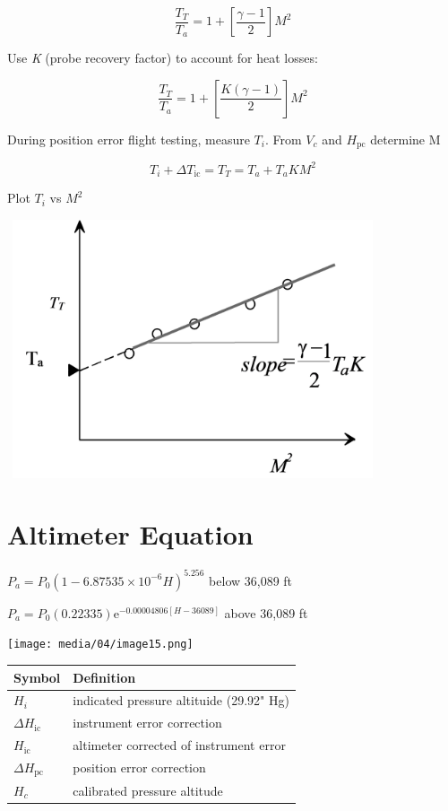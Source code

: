 \documentclass[
]{book}
\begin{document}
\[ \frac{T_T}{T_a} = 1 + \left[ \frac{\gamma - 1}{2} \right] M^2 \]

Use \emph{K} (probe recovery factor) to account for heat losses:

\[ \frac{T_T}{T_a} = 1 + \left[ \frac{K(\gamma - 1)}{2} \right] M^2 \]

During position error flight testing, measure \(T_i\). From \(V_c\) and \(H_{\mathrm{pc}}\) determine M

\[ T_i + \Delta T_{\mathrm{ic}} = T_T = T_a + T_aKM^2 \]

Plot \(T_i\) vs \(M^2\)

\includegraphics[width=4.3125in,height=3in]{media/04/image14.svg}

\hypertarget{altimeter-equation}{%
\section{Altimeter Equation}\label{altimeter-equation}}

\(P_a = P_0 \left(1-6.875 35 \times 10^{-6} H\right)^{5.256}\) below 36,089 ft

\(P_a = P_0 \left(0.223 35 \right) \textrm{e}^{-0.000 048 06[H-36089]}\) above 36,089 ft

\texttt{[image: media/04/image15.png]}

\begin{longtable}[]{@{}ll@{}}
\toprule
Symbol & Definition\tabularnewline
\midrule
\endhead
\(H_i\) & indicated pressure altituide (29.92" Hg)\tabularnewline
\(\Delta H_{\mathrm{ic}}\) & instrument error correction\tabularnewline
\(H_{\mathrm{ic}}\) & altimeter corrected of instrument error\tabularnewline
\(\Delta H_{\mathrm{pc}}\) & position error correction\tabularnewline
\(H_c\) & calibrated pressure altitude\tabularnewline
\bottomrule
\end{longtable}
\end{document}
